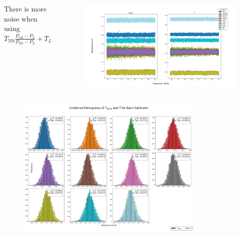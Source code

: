 \documentclass[aspectratio=169]{beamer}
\begin{document}
\begin{frame}

	\begin{columns}
		\begin{column}{0.2\textwidth}
			There is more noise when using $T_{\text{NS}} \frac{P_{\text{cal}} - P_L}{P_{\text{NS}} - P_L} + T_L$
		\end{column}
		\begin{column}{0.8\textwidth}
			\begin{figure}[h]
				\centering
				\includegraphics[width=1\textwidth]{main_scatter_plots.png}
				\label{fig:image1}
			\end{figure}
		\end{column}
	\end{columns}

\end{frame}


\begin{frame}
	\begin{figure}[h]
		\centering
		\includegraphics[width=0.8\textwidth]{combined_histograms.png}
		\label{fig:image2}
	\end{figure}
\end{frame}
\end{document}

